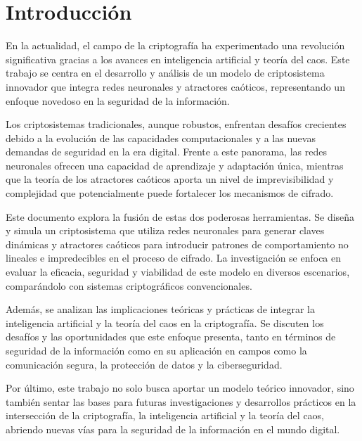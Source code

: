 \chapter*{Introducción}

En la actualidad, el campo de la criptografía ha experimentado una revolución significativa gracias 
a los avances en inteligencia artificial y teoría del caos. Este trabajo se centra en el desarrollo 
y análisis de un modelo de criptosistema innovador que integra redes neuronales y atractores caóticos, 
representando un enfoque novedoso en la seguridad de la información.

Los criptosistemas tradicionales, aunque robustos, enfrentan desafíos crecientes debido a la evolución 
de las capacidades computacionales y a las nuevas demandas de seguridad en la era digital. Frente a este 
panorama, las redes neuronales ofrecen una capacidad de aprendizaje y adaptación única, mientras que la 
teoría de los atractores caóticos aporta un nivel de imprevisibilidad y complejidad que potencialmente 
puede fortalecer los mecanismos de cifrado.

Este documento explora la fusión de estas dos poderosas herramientas. Se diseña y simula un criptosistema 
que utiliza redes neuronales para generar claves dinámicas y atractores caóticos para introducir patrones 
de comportamiento no lineales e impredecibles en el proceso de cifrado. La investigación se enfoca en evaluar 
la eficacia, seguridad y viabilidad de este modelo en diversos escenarios, comparándolo con sistemas 
criptográficos convencionales.

Además, se analizan las implicaciones teóricas y prácticas de integrar la inteligencia artificial y la 
teoría del caos en la criptografía. Se discuten los desafíos y las oportunidades que este enfoque presenta, 
tanto en términos de seguridad de la información como en su aplicación en campos como la comunicación segura, 
la protección de datos y la ciberseguridad.

Por último, este trabajo no solo busca aportar un modelo teórico innovador, sino también sentar las bases para 
futuras investigaciones y desarrollos prácticos en la intersección de la criptografía, la inteligencia artificial 
y la teoría del caos, abriendo nuevas vías para la seguridad de la información en el mundo digital.